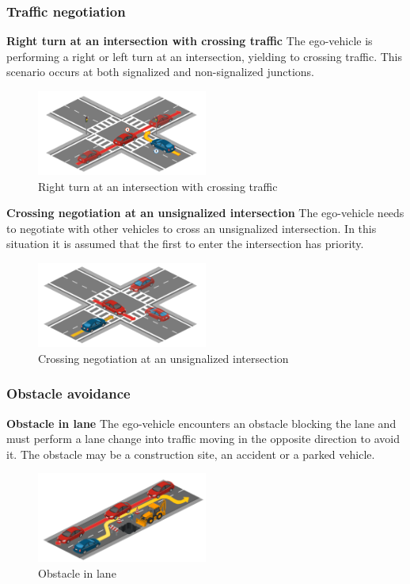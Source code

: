 \documentclass{article}
\begin{document}
\subsubsection{Traffic negotiation}
\textbf{Right turn at an intersection with crossing traffic} 
The ego-vehicle is performing a right or left turn at an intersection, yielding to crossing traffic. This scenario occurs at both signalized and non-signalized junctions.
\begin{figure}[h]
    \centering
    \includegraphics[width=0.5\textwidth]{img/TR09.png}
    \caption{Right turn at an intersection with crossing traffic} \label{Scenario_trafficNegtiation}
\end{figure}

\textbf{Crossing negotiation at an unsignalized intersection} 
The ego-vehicle needs to negotiate with other vehicles to cross an unsignalized intersection. In this situation it is assumed that the first to enter 
the intersection has priority.
\begin{figure}[h]
    \centering
    \includegraphics[width=0.5\textwidth]{img/TR10.png}
    \caption{Crossing negotiation at an unsignalized intersection} \label{Scenario_crossingNegotiation}
\end{figure}

\subsubsection{Obstacle avoidance}
\textbf{Obstacle in lane} 
The ego-vehicle encounters an obstacle blocking the lane and must perform a lane change into traffic moving in the opposite direction to avoid it. 
The obstacle may be a construction site, an accident or a parked vehicle.
\begin{figure}[h]
    \centering
    \includegraphics[width=0.5\textwidth]{img/TR14a.png}
    \caption{Obstacle in lane} \label{Scenario_obstacle}
\end{figure}
\end{document}
